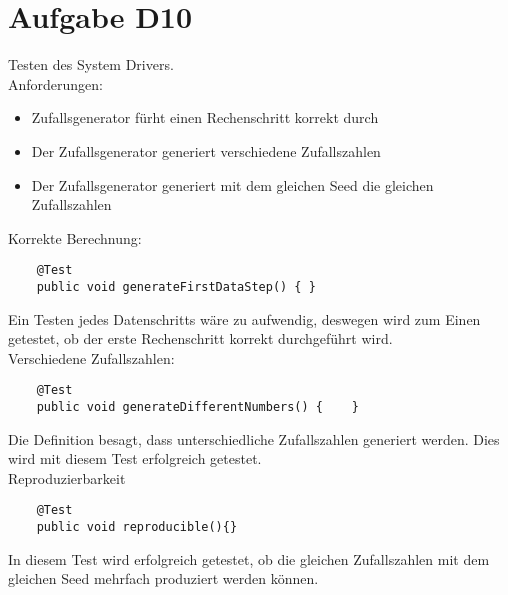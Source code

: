 
\chapter{Aufgabe D10}
Testen des System Drivers.\\
Anforderungen:
\begin{itemize}
	\item Zufallsgenerator fürht einen Rechenschritt korrekt durch
	\item Der Zufallsgenerator generiert verschiedene Zufallszahlen
	\item Der Zufallsgenerator generiert mit dem gleichen Seed die gleichen Zufallszahlen
\end{itemize}

Korrekte Berechnung:
\begin{lstlisting}
    @Test
    public void generateFirstDataStep() { }
 \end{lstlisting}
 Ein Testen jedes Datenschritts wäre zu aufwendig, deswegen wird zum Einen getestet, ob der erste Rechenschritt korrekt durchgeführt wird.\\
 
 Verschiedene Zufallszahlen:
\begin{lstlisting}
    @Test
    public void generateDifferentNumbers() {    }
\end{lstlisting}
Die Definition besagt, dass unterschiedliche Zufallszahlen generiert werden. Dies wird mit diesem Test erfolgreich getestet.\\
    
Reproduzierbarkeit
\begin{lstlisting}
    @Test
    public void reproducible(){}
\end{lstlisting}
In diesem Test wird erfolgreich getestet, ob die gleichen Zufallszahlen mit dem gleichen Seed mehrfach produziert werden können.